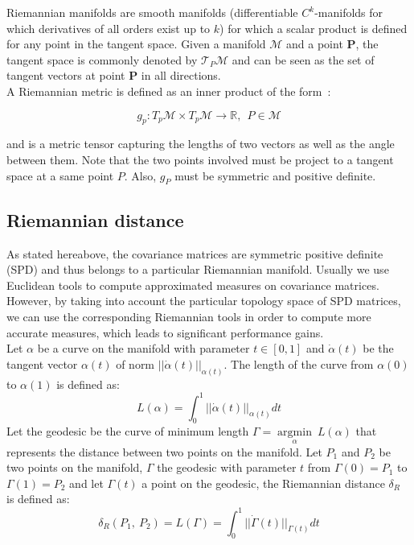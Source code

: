 \documentclass[a4paper,11pt]{report}
\begin{document}
Riemannian manifolds are smooth manifolds (differentiable $C^k$-manifolds for which derivatives of all orders exist up to $k$)
for which a scalar product is defined for any point in the tangent space. Given a manifold $\mathcal{M}$ and a point $\textbf{P}$,
the tangent space is commonly denoted by $\mathcal{T}_P \mathcal{M}$ and can be seen as the set of tangent vectors at point $\textbf{P}$ in all directions.\\
A Riemannian metric is defined as an inner product of the form~\citep{barac2012, barachant:tel-01196752}:

\begin{equation}
    g_p: T_p \mathcal{M} \times T_p \mathcal{M} \rightarrow \mathbb{R}, \ \ P \in \mathcal{M}
\end{equation}

and is a metric tensor capturing the lengths of two vectors as well as the angle between them. Note that the two
points involved must be project to a tangent space at a same point $P$. Also, $g_P$ must be symmetric and positive definite.

\subsection{Riemannian distance}

As stated hereabove, the covariance matrices are symmetric positive definite (SPD) and thus belongs to a particular Riemannian manifold. Usually we use Euclidean tools to compute approximated measures on covariance matrices. However, by taking into account the particular topology space of SPD matrices, we can use the corresponding Riemannian tools in order to compute more accurate measures, which leads to significant performance gains.\\

Let $\alpha$ be a curve on the manifold with parameter $t \in [0, 1]$ and $\dot{\alpha}(t)$ be the tangent vector $\alpha (t)$ of norm $||\dot{\alpha}(t)||_{\alpha (t)}$. The length of the curve from $\alpha (0)$ to $\alpha (1)$ is defined as:
$$L(\alpha) = \int_{0}^{1} ||\dot{\alpha}(t)||_{\alpha (t)} dt$$
Let the geodesic be the curve of minimum length $\Gamma = \mathop{\mathrm{argmin}}\limits_{\alpha}\ L(\alpha)$ that represents the distance between two points on the manifold.
Let $P_1$ and $P_2$ be two points on the manifold, $\Gamma$ the geodesic with parameter $t$ from $\Gamma(0) = P_1$ to $\Gamma(1) = P_2$ and let $\Gamma(t)$ a point on the geodesic, the Riemannian distance $\delta_R$ is defined as:
$$\delta_R (P_1,\ P_2) = L(\Gamma) = \int_{0}^{1} ||\dot{\Gamma}(t)||_{\Gamma (t)} dt$$
\end{document}
